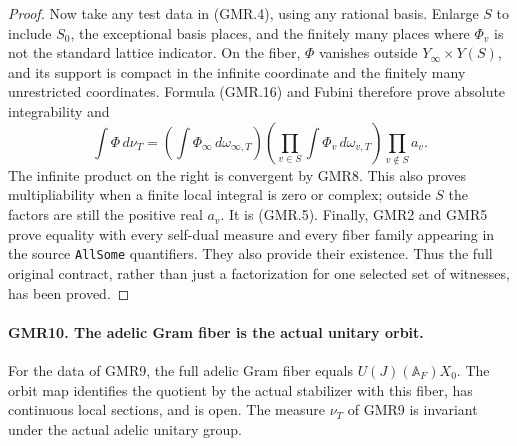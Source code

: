 \documentclass[11pt,a4paper]{article}
\numberwithin{equation}{section}
\theoremstyle{remark}\newtheorem{remark}[theorem]{Remark}
\begin{document}
\begin{proof}
Now take any test data in (GMR.4), using any rational basis.  Enlarge
$S$ to include $S_0$, the exceptional basis places, and the finitely
many places where $\Phi_v$ is not the standard lattice indicator.
On the fiber, $\Phi$ vanishes outside $Y_\infty\times Y(S)$, and its
support is compact in the infinite coordinate and the finitely many
unrestricted coordinates.  Formula (GMR.16) and Fubini therefore
prove absolute integrability and
\[
 \int\Phi\,d\nu_T
 =\left(\int\Phi_\infty\,d\omega_{\infty,T}\right)
   \left(\prod_{v\in S}\int\Phi_v\,d\omega_{v,T}\right)
   \prod_{v\notin S}a_v.
 \tag{GMR.17}
\]
The infinite product on the right is convergent by GMR8.  This also
proves multipliability when a finite local integral is zero or
complex; outside $S$ the factors are still the positive real $a_v$.
It is (GMR.5).  Finally, GMR2 and GMR5 prove equality with every
self-dual measure and every fiber family appearing in the source
\texttt{All\allowbreak Some} quantifiers.  They also provide their existence.
Thus the full original contract, rather than just a factorization
for one selected set of witnesses, has been proved.
\end{proof}

\paragraph{GMR10. The adelic Gram fiber is the actual unitary orbit.}
\label{claim:GMR10}
For the data of GMR9, the full adelic Gram fiber equals
$U(J)(\mathbb A_F)X_0$.  The orbit map identifies the quotient by the
actual stabilizer with this fiber, has continuous local sections, and
is open.  The measure $\nu_T$ of GMR9 is invariant under the actual
adelic unitary group.
\end{document}
